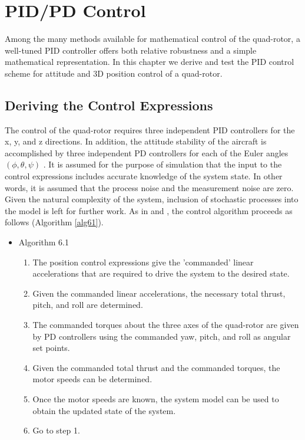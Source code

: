 
\chapter{PID/PD Control} %

\label{Chapter6} %


Among the many methods available for mathematical control of the quad-rotor, a well-tuned PID controller offers both relative robustness and a simple mathematical representation. In this chapter we derive and test the PID control scheme for attitude and 3D position control of a quad-rotor.


\section{Deriving the Control Expressions}

The control of the quad-rotor requires three independent PID controllers for the x, y, and z directions. In addition, the attitude stability of the aircraft is accomplished by three independent PD controllers for each of the Euler angles $(\phi,\theta,\psi)$ . It is assumed for the purpose of simulation that the input to the control expressions includes accurate knowledge of the system state. In other words, it is assumed that the process noise and the measurement noise are zero. Given the natural complexity of the system, inclusion of stochastic processes into the model is left for further work. As in \cite{bouabdallah2004pid} and \cite{Luukkonen}, the control algorithm proceeds as follows (Algorithm \ref{alg61}).

\begin{itemize}
\label{alg61}
\item Algorithm 6.1
    \begin{enumerate}
    \item The position control expressions give the 'commanded' linear accelerations that are required to drive the system to the desired state.
    \item Given the commanded linear accelerations, the necessary total thrust, pitch, and roll are determined.
    \item The commanded torques about the three axes of the quad-rotor are given by PD controllers using the commanded yaw, pitch, and roll as angular set points.
    \item Given the commanded total thrust and the commanded torques, the motor speeds can be determined.
    \item Once the motor speeds are known, the system model can be used to obtain the updated state of the system.
    \item Go to step 1.
    \end{enumerate}
\end{itemize}


